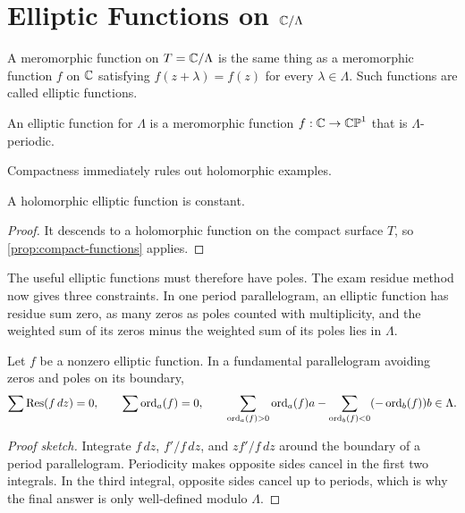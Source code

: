 \chapter{Elliptic Functions on \texorpdfstring{\(\mathbb{C}/\Lambda\)}{C/Lambda}}
\label{ch:elliptic-functions}

A meromorphic function on \(T=\mathbb{C}/\Lambda\) is the same thing as a meromorphic
function \(f\) on \(\mathbb{C}\) satisfying \(f(z+\lambda)=f(z)\) for every
\(\lambda\in\Lambda\).  Such functions are called elliptic functions.

\begin{definition}
An elliptic function for \(\Lambda\) is a meromorphic function
\(f:\mathbb{C}\to\mathbb{CP}^1\) that is \(\Lambda\)-periodic.
\end{definition}

Compactness immediately rules out holomorphic examples.

\begin{proposition}
\label{prop:no-holomorphic-elliptic}
A holomorphic elliptic function is constant.
\end{proposition}

\begin{proof}
It descends to a holomorphic function on the compact surface \(T\), so
\cref{prop:compact-functions} applies.
\end{proof}

The useful elliptic functions must therefore have poles.  The exam residue
method now gives three constraints.  In one period parallelogram, an elliptic
function has residue sum zero, as many zeros as poles counted with multiplicity,
and the weighted sum of its zeros minus the weighted sum of its poles lies in
\(\Lambda\).

\begin{theorem}
\label{thm:elliptic-liouville}
Let \(f\) be a nonzero elliptic function.  In a fundamental parallelogram avoiding
zeros and poles on its boundary,
\[
  \sum \operatorname{Res}(f\,dz)=0,\qquad
  \sum \operatorname{ord}_a(f)=0,\qquad
  \sum_{\operatorname{ord}_a(f)>0}\operatorname{ord}_a(f)a-\sum_{\operatorname{ord}_b(f)<0}(-\operatorname{ord}_b(f))b\in\Lambda .
\]
\end{theorem}

\begin{proof}[Proof sketch]
Integrate \(f\,dz\), \(f'/f\,dz\), and \(z f'/f\,dz\) around the boundary of a
period parallelogram.  Periodicity makes opposite sides cancel in the first two
integrals.  In the third integral, opposite sides cancel up to periods, which is
why the final answer is only well-defined modulo \(\Lambda\).
\end{proof}

